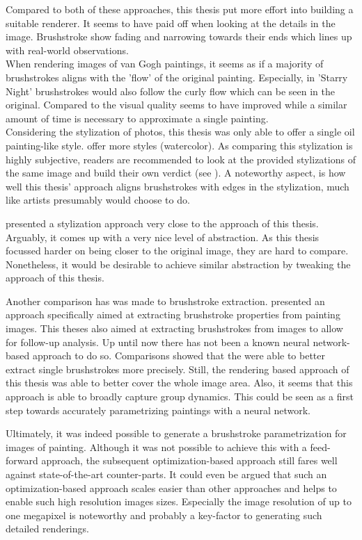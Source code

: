 Compared to both of these approaches, this thesis put more effort into building a suitable renderer.
It seems to have paid off when looking at the details in the image.
Brushstroke show fading and narrowing towards their ends which lines up with real-world observations.\\
When rendering images of van Gogh paintings, it seems as if a majority of brushstrokes aligns with the 'flow' of the original painting.
Especially, in 'Starry Night' brushstrokes would also follow the curly flow which can be seen in the original.
Compared to \citeauthor*{LpaintB} the visual quality seems to have improved while a similar amount of time is necessary to approximate a single painting.\\
Considering the stylization of photos, this thesis was only able to offer a single oil painting-like style.
\citeauthor*{LpaintB} offer more styles (\eg watercolor).
As comparing this stylization is highly subjective, readers are recommended to look at the provided stylizations of the same image and build their own verdict (see ).
A noteworthy aspect, is how well this thesis' approach aligns brushstrokes with edges in the stylization, much like artists presumably would choose to do.

\citeauthor*{neuralpainters} presented a stylization approach very close to the approach of this thesis.
Arguably, it comes up with a very nice level of abstraction.
As this thesis focussed harder on being closer to the original image, they are hard to compare.
Nonetheless, it would be desirable to achieve similar abstraction by tweaking the approach of this thesis.


Another comparison has was made to brushstroke extraction.
\citeauthor*{lamberti} presented an approach specifically aimed at extracting brushstroke properties from painting images.
This theses also aimed at extracting brushstrokes from images to allow for follow-up analysis.
Up until now there has not been a known neural network-based approach to do so.
Comparisons showed that the \citeauthor*{lamberti} were able to better extract single brushstrokes more precisely.
Still, the rendering based approach of this thesis was able to better cover the whole image area.
Also, it seems that this approach is able to broadly capture group dynamics.
This could be seen as a first step towards accurately parametrizing paintings with a neural network.


Ultimately, it was indeed possible to generate a brushstroke parametrization for images of painting.
Although it was not possible to achieve this with a feed-forward approach, the subsequent optimization-based approach still fares well against state-of-the-art counter-parts.
It could even be argued that such an optimization-based approach scales easier than other approaches and helps to enable such high resolution images sizes.
Especially the image resolution of up to one megapixel is noteworthy and probably a key-factor to generating such detailed renderings.

